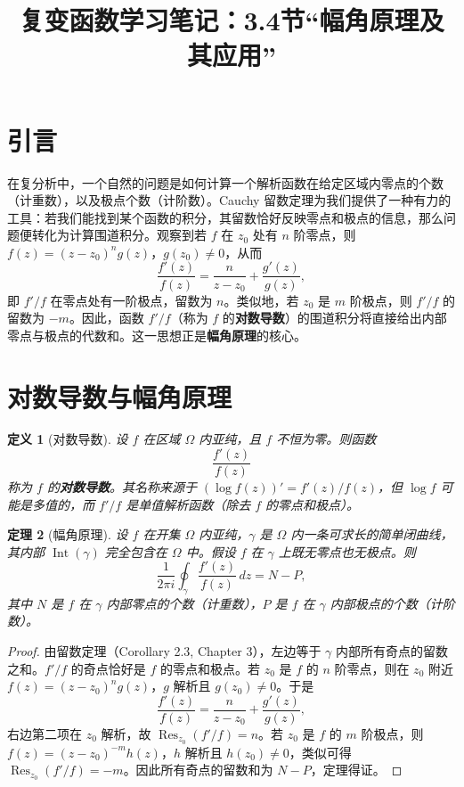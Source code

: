 \documentclass[UTF8]{ctexart}
\title{复变函数学习笔记：3.4节“幅角原理及其应用”}
\date{}
\newtheorem{theorem}{定理}[section]
\newtheorem{definition}[theorem]{定义}
\numberwithin{equation}{section}
\begin{document}
\maketitle

\section{引言}

在复分析中，一个自然的问题是如何计算一个解析函数在给定区域内零点的个数（计重数），以及极点个数（计阶数）。Cauchy 留数定理为我们提供了一种有力的工具：若我们能找到某个函数的积分，其留数恰好反映零点和极点的信息，那么问题便转化为计算围道积分。观察到若 $f$ 在 $z_0$ 处有 $n$ 阶零点，则 $f(z)=(z-z_0)^n g(z)$，$g(z_0)\neq0$，从而
\[
\frac{f'(z)}{f(z)} = \frac{n}{z-z_0} + \frac{g'(z)}{g(z)},
\]
即 $f'/f$ 在零点处有一阶极点，留数为 $n$。类似地，若 $z_0$ 是 $m$ 阶极点，则 $f'/f$ 的留数为 $-m$。因此，函数 $f'/f$（称为 $f$ 的\textbf{对数导数}）的围道积分将直接给出内部零点与极点的代数和。这一思想正是\textbf{幅角原理}的核心。

\section{对数导数与幅角原理}

\begin{definition}[对数导数]
设 $f$ 在区域 $\Omega$ 内亚纯，且 $f$ 不恒为零。则函数
\[
\frac{f'(z)}{f(z)}
\]
称为 $f$ 的\textbf{对数导数}。其名称来源于 $( \log f(z) )' = f'(z)/f(z)$，但 $\log f$ 可能是多值的，而 $f'/f$ 是单值解析函数（除去 $f$ 的零点和极点）。
\end{definition}

\begin{theorem}[幅角原理]
设 $f$ 在开集 $\Omega$ 内亚纯，$\gamma$ 是 $\Omega$ 内一条可求长的简单闭曲线，其内部 $\operatorname{Int}(\gamma)$ 完全包含在 $\Omega$ 中。假设 $f$ 在 $\gamma$ 上既无零点也无极点。则
\[
\frac{1}{2\pi i}\oint_{\gamma} \frac{f'(z)}{f(z)}\,dz = N - P,
\]
其中 $N$ 是 $f$ 在 $\gamma$ 内部零点的个数（计重数），$P$ 是 $f$ 在 $\gamma$ 内部极点的个数（计阶数）。
\end{theorem}

\begin{proof}
由留数定理（Corollary 2.3, Chapter 3），左边等于 $\gamma$ 内部所有奇点的留数之和。$f'/f$ 的奇点恰好是 $f$ 的零点和极点。若 $z_0$ 是 $f$ 的 $n$ 阶零点，则在 $z_0$ 附近 $f(z)=(z-z_0)^n g(z)$，$g$ 解析且 $g(z_0)\neq0$。于是
\[
\frac{f'(z)}{f(z)} = \frac{n}{z-z_0} + \frac{g'(z)}{g(z)},
\]
右边第二项在 $z_0$ 解析，故 $\operatorname{Res}_{z_0}(f'/f)=n$。若 $z_0$ 是 $f$ 的 $m$ 阶极点，则 $f(z)=(z-z_0)^{-m}h(z)$，$h$ 解析且 $h(z_0)\neq0$，类似可得 $\operatorname{Res}_{z_0}(f'/f)=-m$。因此所有奇点的留数和为 $N-P$，定理得证。
\end{proof}
\end{document}
